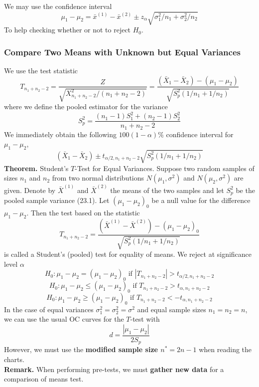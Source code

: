 \documentclass[a4paper,12pt]{article}
\begin{document}
\noindent We may use the confidence interval
\begin{equation}
    \mu_1-\mu_2=\bar{x}^{(1)}-\bar{x}^{(2)} \pm z_\alpha \sqrt{\sigma_1^2 / n_1+\sigma_2^2 / n_2}
    \end{equation}
    To help checking whether or not to reject $H_0$.

\subsubsection{Compare Two Means with Unknown but Equal Variances}
We use the test statistic
\begin{equation}
    T_{n_1+n_2-2} =\frac{Z}{\sqrt{X_{n_1+n_2-2}^2 /\left(n_1+n_2-2\right)}}
    =\frac{\left(\bar{X}_1-\bar{X}_2\right)-\left(\mu_1-\mu_2\right)}{\sqrt{S_p^2\left(1 / n_1+1 / n_2\right)}}
    \end{equation}
    where we define the pooled estimator for the variance
    \begin{equation}
        S_p^2=\frac{\left(n_1-1\right) S_1^2+\left(n_2-1\right) S_2^2}{n_1+n_2-2}
        \end{equation}
    We immediately obtain the following $100(1-\alpha) \%$ confidence interval for $\mu_1-\mu_2$,
    \begin{equation}
    \left(\bar{X}_1-\bar{X}_2\right) \pm t_{\alpha / 2, n_1+n_2-2} \sqrt{S_p^2\left(1 / n_1+1 / n_2\right)}
    \end{equation}
    \textbf{Theorem.} Student's $T$-Test for Equal Variances. Suppose two random samples of sizes $n_1$ and $n_2$ from two normal distributions $N\left(\mu_1, \sigma^2\right)$ and $N\left(\mu_2, \sigma^2\right)$ are given.
Denote by $\bar{X}^{(1)}$ and $\bar{X}^{(2)}$ the means of the two samples and let $S_p^2$ be the pooled sample variance (23.1). Let $\left(\mu_1-\mu_2\right)_0$ be a null value for the difference $\mu_1-\mu_2$. Then the test based on the statistic
$$
T_{n_1+n_2-2}=\frac{\left(\bar{X}^{(1)}-\bar{X}^{(2)}\right)-\left(\mu_1-\mu_2\right)_0}{\sqrt{S_p^2\left(1 / n_1+1 / n_2\right)}}
$$
is called a Student's (pooled) test for equality of means.
We reject at significance level $\alpha$
$$H_0: \mu_1-\mu_2=\left(\mu_1-\mu_2\right)_0 \text{ if }\left|T_{n_1+n_2-2}\right|>t_{\alpha / 2, n_1+n_2-2}$$
$$H_0: \mu_1-\mu_2 \leq\left(\mu_1-\mu_2\right)_0 \text{ if }T_{n_1+n_2-2}>t_{\alpha, n_1+n_2-2}$$
$$H_0: \mu_1-\mu_2 \geq\left(\mu_1-\mu_2\right)_0 \text{ if }T_{n_1+n_2-2}<-t_{\alpha, n_1+n_2-2}$$
In the case of equal variances $\sigma_1^2=\sigma_2^2=\sigma^2$ and equal sample sizes $n_1=n_2=n$, we can use the usual $\mathrm{OC}$ curves for the $T$-test with
$$
d=\frac{\left|\mu_1-\mu_2\right|}{2 S_p}
$$
However, we must use the \textbf{modified sample size $n^*=2n-1$} when reading the charts.\\
\textbf{Remark.} When performing pre-tests, we must \textbf{gather new data} for a comparison of means test.
\end{document}
